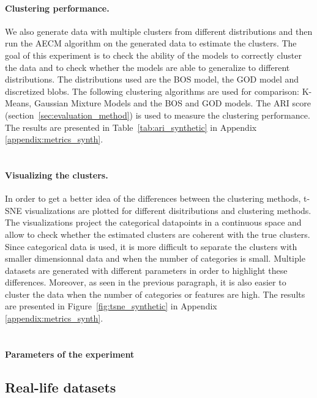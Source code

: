 \paragraph{Clustering performance.}
We also generate data with multiple clusters from different distributions and then run the AECM algorithm on the generated data to estimate the clusters. The goal of this experiment is to check the ability of the models to correctly cluster the data and to check whether the models are able to generalize to different distributions.
The distributions used are the BOS model, the GOD model and discretized blobs.
The following clustering algorithms are used for comparison: K-Means, Gaussian Mixture Models and the BOS and GOD models. The ARI score (section~\ref{sec:evaluation_method}) is used to measure the clustering performance. The results are presented in Table~\ref{tab:ari_synthetic} in Appendix \ref{appendix:metrics_synth}. \\ \\

\paragraph{Visualizing the clusters.}
In order to get a better idea of the differences between the clustering methods, t-SNE visualizations \citep{van2008visualizing} are plotted for different disitributions and clustering methods. The visualizations project the categorical datapoints in a continuous space and allow to check whether the estimated clusters are coherent with the true clusters. Since categorical data is used, it is more difficult to separate the clusters with smaller dimensionnal data and when the number of categories is small. Multiple datasets are generated with different parameters in order to highlight these differences. Moreover, as seen in the previous paragraph, it is also easier to cluster the data when the number of categories or features are high.
The results are presented in Figure~\ref{fig:tsne_synthetic} in Appendix \ref{appendix:metrics_synth}. \\ \\

\paragraph{Parameters of the experiment}

\subsection{Real-life datasets}
